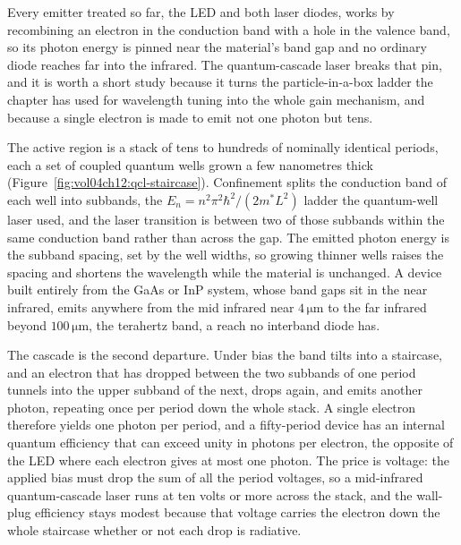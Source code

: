 Every emitter treated so far, the LED and both laser diodes, works by
recombining an electron in the conduction band with a hole in the valence
band, so its photon energy is pinned near the material's band gap and no
ordinary diode reaches far into the infrared. The quantum-cascade laser
breaks that pin, and it is worth a short study because it turns the
particle-in-a-box ladder the chapter has used for wavelength tuning into
the whole gain mechanism, and because a single electron is made to emit
not one photon but tens.

The active region is a stack of tens to hundreds of nominally identical
periods, each a set of coupled quantum wells grown a few nanometres thick
(Figure~\ref{fig:vol04ch12:qcl-staircase}). Confinement splits the
conduction band of each well into subbands, the $E_n = n^{2}\pi^{2}\hbar^{2}
/(2m^{*}L^{2})$ ladder the quantum-well laser used, and the laser
transition is between two of those subbands within the same conduction
band rather than across the gap. The emitted photon energy is the subband
spacing, set by the well widths, so growing thinner wells raises the
spacing and shortens the wavelength while the material is unchanged. A
device built entirely from the GaAs or InP system, whose band gaps sit in
the near infrared, emits anywhere from the mid infrared near
$4\,\si{\micro\meter}$ to the far infrared beyond $100\,\si{\micro\meter}$,
the terahertz band, a reach no interband diode has.

The cascade is the second departure. Under bias the band tilts into a
staircase, and an electron that has dropped between the two subbands of one
period tunnels into the upper subband of the next, drops again, and emits
another photon, repeating once per period down the whole stack. A single
electron therefore yields one photon per period, and a fifty-period device
has an internal quantum efficiency that can exceed unity in photons per
electron, the opposite of the LED where each electron gives at most one
photon. The price is voltage: the applied bias must drop the sum of all the
period voltages, so a mid-infrared quantum-cascade laser runs at ten volts
or more across the stack, and the wall-plug efficiency stays modest because
that voltage carries the electron down the whole staircase whether or not
each drop is radiative.

